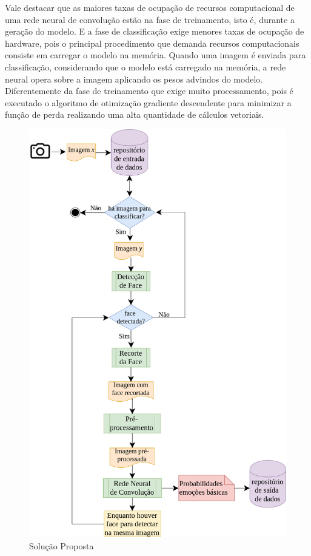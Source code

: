Vale destacar que as maiores taxas de ocupação de recursos computacional de uma rede neural de convolução estão na fase de treinamento, isto é, durante a geração do modelo. E a fase de classificação exige menores taxas de ocupação de hardware, pois o principal procedimento que demanda recursos computacionais consiste em carregar o modelo na memória. Quando uma imagem é enviada para classificação, considerando que o modelo está carregado na memória, a rede neural opera sobre a imagem aplicando os pesos advindos do modelo. Diferentemente da fase de treinamento que exige muito processamento, pois é executado o algoritmo de otimização gradiente descendente para minimizar a função de perda realizando uma alta quantidade de cálculos vetoriais.   


\begin{figure}
\centering
\includegraphics[scale=0.45]{figuras/arquitetura.png}
\caption{Solução Proposta}
\label{fig:arquitetura}
\end{figure}

